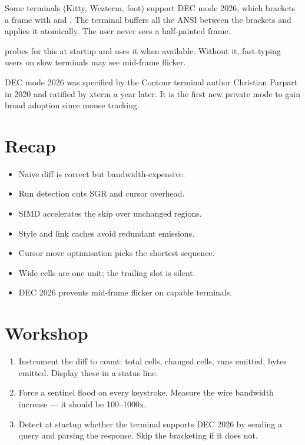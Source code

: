 Some terminals (Kitty, Wezterm, foot) support DEC mode 2026,
which brackets a frame with \code{ESC [ ? 2026 h} and
\code{ESC [ ? 2026 l}. The terminal buffers all the ANSI
between the brackets and applies it atomically. The user never
sees a half-painted frame.

\maya{} probes for this at startup and uses it when available.
Without it, fast-typing users on slow terminals may see
mid-frame flicker.

\begin{funfact}
DEC mode 2026 was specified by the Contour terminal author
Christian Parpart in 2020 and ratified by xterm a year later.
It is the first new private mode to gain broad adoption since
mouse tracking.
\end{funfact}

\section{Recap}

\begin{recap}
\begin{itemize}[leftmargin=*]
  \item Naive diff is correct but bandwidth-expensive.
  \item Run detection cuts SGR and cursor overhead.
  \item SIMD accelerates the skip over unchanged regions.
  \item Style and link caches avoid redundant emissions.
  \item Cursor move optimisation picks the shortest sequence.
  \item Wide cells are one unit; the trailing slot is silent.
  \item DEC 2026 prevents mid-frame flicker on capable
    terminals.
\end{itemize}
\end{recap}

\section*{Workshop}

\begin{enumerate}[leftmargin=*]
  \item Instrument the diff to count: total cells, changed
    cells, runs emitted, bytes emitted. Display these in a
    status line.
  \item Force a sentinel flood on every keystroke. Measure the
    wire bandwidth increase --- it should be 100--1000x.
  \item Detect at startup whether the terminal supports DEC
    2026 by sending a query and parsing the response. Skip the
    bracketing if it does not.
\end{enumerate}
